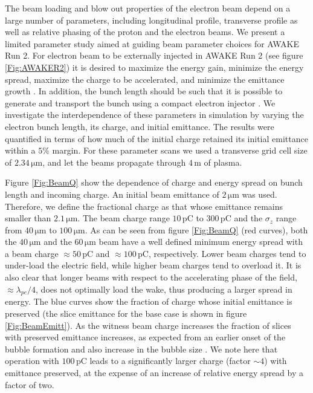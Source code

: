 \documentclass[aps,prstab,reprint,amsmath,amssymb,groupedaddress,onecolumn]{revtex4-1}
\newcommand{\unit}[1]{\,\mathrm{#1}}
\begin{document}
The beam loading and blow out properties of the electron beam depend on a large number of parameters, including %
longitudinal profile, %
transverse profile as well as %
relative phasing of the proton and the electron beams.  We present a limited parameter study aimed at guiding beam parameter choices for AWAKE Run 2.
For electron beam to be externally injected in AWAKE Run 2 (see figure \ref{Fig:AWAKER2}) it is desired to maximize the energy gain, minimize the energy spread, maximize the charge to be accelerated, and minimize the emittance growth \cite{adli:2016}. In addition, the bunch length should be such that it is possible to
generate and transport the bunch using a compact electron injector \cite{adli:2016}. We
investigate the interdependence of these parameters in simulation by varying the electron bunch length, its charge,
and initial emittance. The results were quantified in terms of how much of the initial charge retained its initial
emittance within a $5\%$ margin. For these parameter scans we used a transverse grid cell size of $2.34\unit{\mu m}$,
and let the beams propagate through $4\unit{m}$ of plasma.

Figure \ref{Fig:BeamQ}  show the dependence of %
charge and energy spread on bunch length and %
incoming charge.  An initial beam
emittance of $2\unit{\mu m}$ was used.  %
Therefore, we define the fractional charge as that whose emittance remains smaller than $2.1\unit{\mu m}$. %
The beam charge range $10\unit{pC}$ to $300\unit{pC}$ and %
the $\sigma_{z}$ range from $40\unit{\mu m}$ to $100\unit{\mu m}$.  As can be seen from figure \ref{Fig:BeamQ} %
(red curves), both the
$40\unit{\mu m}$ and the $60\unit{\mu m}$ beam %
have a well defined minimum energy spread with a beam charge
$\approx 50\unit{pC}$ and $\approx 100\unit{pC}$, respectively. Lower beam charges tend to under-load the electric field,
while higher beam charges tend to overload it. It is also clear that longer beams with respect to the accelerating phase
of the field, $\approx\lambda_{pe}/4$, %
does not optimally load the wake, thus producing a larger spread in energy.  The blue curves show the fraction of %
charge whose initial emittance is preserved (the slice%
  emittance for the base case is shown in figure \ref{Fig:BeamEmitt}).  As the witness beam charge increases the fraction of slices with preserved emittance increases, as expected from an earlier onset of the bubble formation and also increase in the bubble size \cite{lu:2006-1, lu:2006}.
We note here that operation with $100\unit{pC}$ leads to a significantly larger charge (factor $\sim 4$) with emittance preserved, at the expense of an increase of relative energy spread by a factor of two. %
\end{document}

